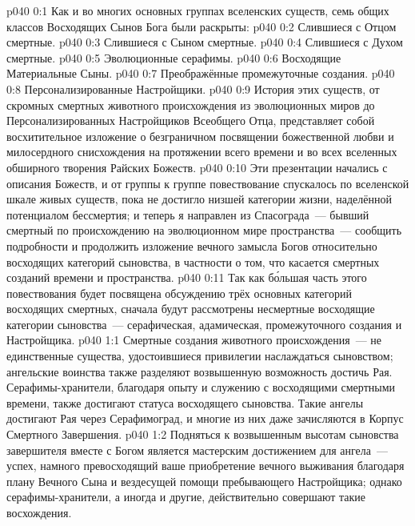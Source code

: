 \author{Могущественный Посланник}
\vs p040 0:1 Как и во многих основных группах вселенских существ, семь общих классов Восходящих Сынов Бога были раскрыты:
\vs p040 0:2 Слившиеся с Отцом смертные.
\vs p040 0:3 Слившиеся с Сыном смертные.
\vs p040 0:4 Слившиеся с Духом смертные.
\vs p040 0:5 Эволюционные серафимы.
\vs p040 0:6 Восходящие Материальные Сыны.
\vs p040 0:7 Преображённые промежуточные создания.
\vs p040 0:8 Персонализированные Настройщики.
\vs p040 0:9 \pc История этих существ, от скромных смертных животного происхождения из эволюционных миров до Персонализированных Настройщиков Всеобщего Отца, представляет собой восхитительное изложение о безграничном посвящении божественной любви и милосердного снисхождения на протяжении всего времени и во всех вселенных обширного творения Райских Божеств.
\vs p040 0:10 Эти презентации начались с описания Божеств, и от группы к группе повествование спускалось по вселенской шкале живых существ, пока не достигло низшей категории жизни, наделённой потенциалом бессмертия; и теперь я направлен из Спасограда~--- бывший смертный по происхождению на эволюционном мире пространства~--- сообщить подробности и продолжить изложение вечного замысла Богов относительно восходящих категорий сыновства, в частности о том, что касается смертных созданий времени и пространства.
\vs p040 0:11 Так как б\'ольшая часть этого повествования будет посвящена обсуждению трёх основных категорий восходящих смертных, сначала будут рассмотрены несмертные восходящие категории сыновства~--- серафическая, адамическая, промежуточного создания и Настройщика.
\vs p040 1:1 Смертные создания животного происхождения~--- не единственные существа, удостоившиеся привилегии наслаждаться сыновством; ангельские воинства также разделяют возвышенную возможность достичь Рая. Серафимы\hyp{}хранители, благодаря опыту и служению с восходящими смертными времени, также достигают статуса восходящего сыновства. Такие ангелы достигают Рая через Серафимоград, и многие из них даже зачисляются в Корпус Смертного Завершения.
\vs p040 1:2 Подняться к возвышенным высотам сыновства завершителя вместе с Богом является мастерским достижением для ангела~--- успех, намного превосходящий ваше приобретение вечного выживания благодаря плану Вечного Сына и вездесущей помощи пребывающего Настройщика; однако серафимы\hyp{}хранители, а иногда и другие, действительно совершают такие восхождения.

